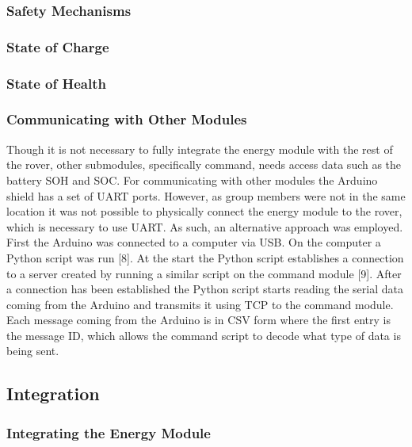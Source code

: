 \documentclass[a4paper]{article}
\begin{document}
\subsubsection{Safety Mechanisms}

\subsubsection{State of Charge}

\subsubsection{State of Health}

\subsubsection{Communicating with Other Modules}
Though it is not necessary to fully integrate the energy module with the rest of the rover, other submodules, specifically command, needs access data such as the battery SOH and SOC. For communicating with other modules the Arduino shield has a set of UART ports. However, as group members were not in the same location it was not possible to physically connect the energy module to the rover, which is necessary to use UART. As such, an alternative approach was employed. First the Arduino was connected to a computer via USB. On the computer a Python script was run [8]. At the start the Python script establishes a connection to a server created by running a similar script on the command module [9]. After a connection has been established the Python script starts reading the serial data coming from the Arduino and transmits it using TCP to the command module. Each message coming from the Arduino is in CSV form where the first entry is the message ID, which allows the command script to decode what type of data is being sent. 


\subsection{Integration}

\subsubsection{Integrating the Energy Module}
\end{document}
